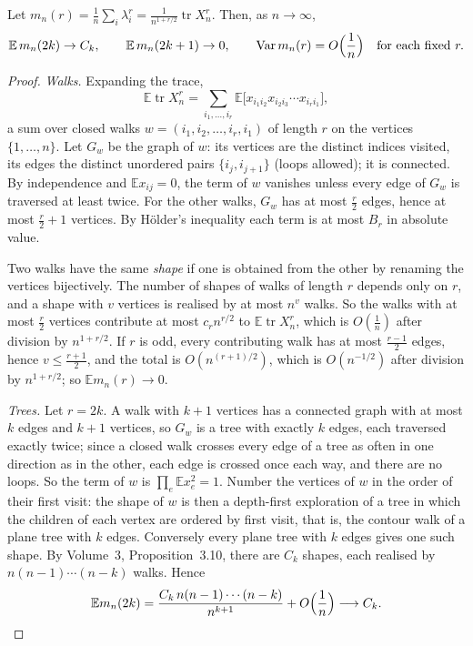 \begin{lemma}\label{moments:lem:walks}
Let $m_n(r)=\frac1n\sum_i\lambda_i^r=\frac1{n^{1+r/2}}\operatorname{tr}X_n^r$. Then, as $n\to\infty$,
\[
\mathbb E\,m_n(2k)\to C_k,\qquad\mathbb E\,m_n(2k+1)\to0,\qquad\operatorname{Var}m_n(r)=O\Bigl(\frac1n\Bigr)\quad\text{for each fixed }r.
\]
\end{lemma}
\begin{proof}
\emph{Walks.} Expanding the trace,
\[
\mathbb E\operatorname{tr}X_n^r=\sum_{i_1,\dots,i_r}\mathbb E\bigl[x_{i_1i_2}x_{i_2i_3}\cdots x_{i_ri_1}\bigr],
\]
a sum over closed walks $w=(i_1,i_2,\dots,i_r,i_1)$ of length $r$ on the vertices $\{1,\dots,n\}$. Let $G_w$ be the graph of $w$: its vertices are the
distinct indices visited, its edges the distinct unordered pairs $\{i_j,i_{j+1}\}$ (loops allowed); it is connected. By independence and $\mathbb Ex_{ij}=0$,
the term of $w$ vanishes unless every edge of $G_w$ is traversed at least twice. For the other walks, $G_w$ has at most $\frac r2$ edges, hence at most
$\frac r2+1$ vertices. By H\"older's inequality each term is at most $B_r$ in absolute value.

Two walks have the same \emph{shape} if one is obtained from the other by renaming the vertices bijectively. The number of shapes of walks of length $r$
depends only on $r$, and a shape with $v$ vertices is realised by at most $n^v$ walks. So the walks with at most $\frac r2$ vertices contribute at most
$c_rn^{r/2}$ to $\mathbb E\operatorname{tr}X_n^r$, which is $O(\frac1n)$ after division by $n^{1+r/2}$. If $r$ is odd, every contributing walk has at most $\frac{r-1}2$ edges, hence $v\le\frac{r+1}2$, and the
total is $O(n^{(r+1)/2})$, which is $O(n^{-1/2})$ after division by $n^{1+r/2}$; so $\mathbb Em_n(r)\to0$.

\emph{Trees.} Let $r=2k$. A walk with $k+1$ vertices has a connected graph with at most $k$ edges and $k+1$ vertices, so $G_w$ is a tree with exactly $k$ edges,
each traversed exactly twice; since a closed walk crosses every edge of a tree as often in one direction as in the other, each edge is crossed once
each way, and there are no loops. So the term of $w$ is $\prod_{e}\mathbb Ex_e^2=1$. Number the vertices of $w$ in the order of their first visit: the shape
of $w$ is then a depth-first exploration of a tree in which the children of each vertex are ordered by first visit, that is, the contour walk of a plane
tree with $k$ edges. Conversely every plane tree with $k$ edges gives one such shape. By Volume~3, Proposition~3.10, there are $C_k$ shapes, each realised
by $n(n-1)\cdots(n-k)$ walks. Hence
\[
\mathbb Em_n(2k)=\frac{C_k\,n(n-1)\cdots(n-k)}{n^{k+1}}+O\Bigl(\frac1n\Bigr)\longrightarrow C_k.
\]


\end{proof}
